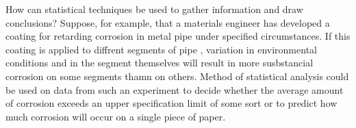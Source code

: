 \documentclass{article}
\begin{document}
How can statistical techniques be used to gather information and draw conclusions? Suppose, for example, that a materials engineer has developed a coating for retarding corrosion in metal pipe under specified circumstances. If this coating is applied to diffrent segments of pipe , variation in environmental conditions and in the segment themselves will result in more susbstancial corrosion on some segments thamn on others. Method of statistical analysis could be used on data from such an experiment to decide whether the average amount of corrosion exceeds an upper specification limit of some sort or to predict how much corrosion will occur on a single piece of paper. 
\end{document}
